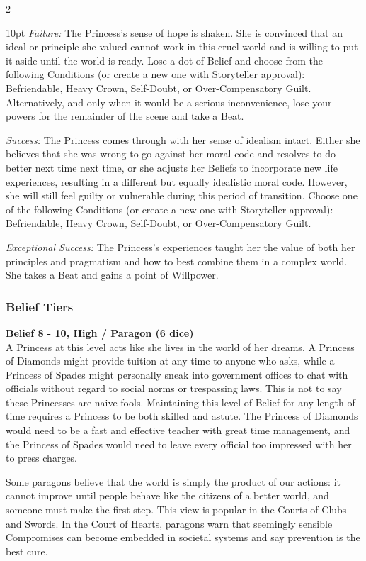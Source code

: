 \begin{multicols}{2}
\begin{myindentpar}{10pt}
\emph{Failure:} The Princess's sense of hope is shaken. She is convinced that an ideal or principle she valued cannot work in this cruel world and is willing to put it aside until the world is ready. Lose a dot of Belief and choose from the following Conditions (or create a new one with Storyteller approval): Befriendable, Heavy Crown, Self-Doubt, or Over-Compensatory Guilt. Alternatively, and only when it would be a serious inconvenience, lose your powers for the remainder of the scene and take a Beat. 

\emph{Success:} The Princess comes through with her sense of idealism intact. Either she believes that she was wrong to go against her moral code and resolves to do better next time next time, or she adjusts her Beliefs to incorporate new life experiences, resulting in a different but equally idealistic moral code. However, she will still feel guilty or vulnerable during this period of transition. Choose one of the following Conditions (or create a new one with Storyteller approval): Befriendable, Heavy Crown, Self-Doubt, or Over-Compensatory Guilt.

\emph{Exceptional Success:} The Princess's experiences taught her the value of both her principles and pragmatism and how to best combine them in a complex world. She takes a Beat and gains a point of Willpower. \end{myindentpar}

\subsubsection*{Belief Tiers}

\noindent\textbf{Belief 8 - 10, High / Paragon (6 dice)} \\

\noindent A Princess at this level acts like she lives in the world of her dreams. A Princess of Diamonds might provide tuition at any time to anyone who asks, while a Princess of Spades might personally sneak into government offices to chat with officials without regard to social norms or trespassing laws. This is not to say these Princesses are naive fools. Maintaining this level of Belief for any length of time requires a Princess to be both skilled and astute. The Princess of Diamonds would need to be a fast and effective teacher with great time management, and the Princess of Spades would need to leave every official too impressed with her to press charges. 

Some paragons believe that the world is simply the product of our actions: it cannot improve until people behave like the citizens of a better world, and someone must make the first step. This view is popular in the Courts of Clubs and Swords. In the Court of Hearts, paragons warn that seemingly sensible Compromises can become embedded in societal systems and say prevention is the best cure. 


\end{multicols}
